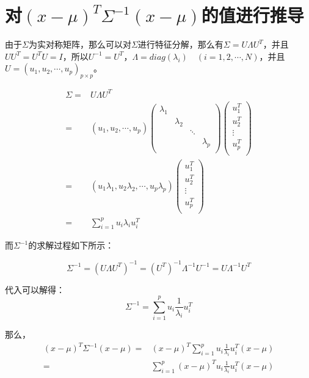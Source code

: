 \documentclass[a4paper]{article}
\begin{document}
\section{对$(x-\mu)^T\Sigma^{-1}(x-\mu)$的值进行推导}
由于$\Sigma$为实对称矩阵，那么可以对$\Sigma$进行特征分解，那么有$\Sigma = U\Lambda U^T$，并且$UU^T=U^TU=I$，所以$U^{-1}=U^T$，$\Lambda=diag(\lambda_i)\quad(i=1,2,\cdots,N)$，并且$U=(u_1,u_2,\cdots,u_p)_{p\times p}$。

\begin{align}
    \Sigma = & U\Lambda U^T \\
    = & (u_1,u_2,\cdots,u_p)
    \begin{pmatrix}
        \lambda_1 & & & \\
        & \lambda_2 & & \\
        & & \ddots & \\
        & & & \lambda_p \\
    \end{pmatrix}
    \begin{pmatrix}
        u_1^T  \\
        u_2^T  \\
        \vdots \\
        u_p^T  \\
    \end{pmatrix} \\
     = & (u_1\lambda_1,u_2\lambda_2,\cdots,u_p\lambda_p)
     \begin{pmatrix}
        u_1^T  \\
        u_2^T  \\
        \vdots \\
        u_p^T  \\
    \end{pmatrix} \\
    = & \sum_{i=1}^{p}u_i\lambda_i u_i^T
\end{align}

而$\Sigma^{-1}$的求解过程如下所示：

\begin{equation}
    \Sigma^{-1} = (U \Lambda U^T)^{-1} = (U^T)^{-1} \Lambda^{-1} U^{-1} = U \Lambda^{-1} U^T
\end{equation}

代入可以解得：
\begin{equation}
    \Sigma^{-1} = \sum_{i=1}^{p}u_i\frac{1}{\lambda_i} u_i^T
\end{equation}

那么，
\begin{align}
    (x-\mu)^T\Sigma^{-1}(x-\mu) = & (x-\mu)^T\sum_{i=1}^{p}u_i\frac{1}{\lambda_i} u_i^T(x-\mu) \\
    = & \sum_{i=1}^{p} (x-\mu)^Tu_i\frac{1}{\lambda_i} u_i^T(x-\mu)
\end{align}
\end{document}
